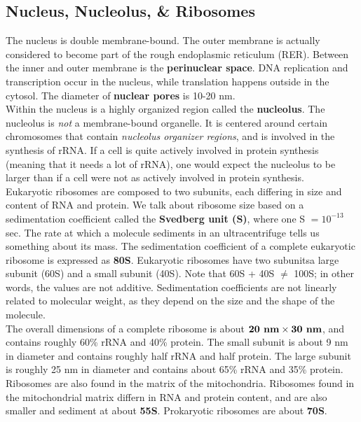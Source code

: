 \documentclass{article}
\theoremstyle{plain}%
\theoremstyle{definition}
\theoremstyle{remark}
\begin{document}
\subsection{Nucleus, Nucleolus, \& Ribosomes}
The nucleus is double membrane-bound. The outer membrane is actually considered to become part of the rough endoplasmic reticulum (RER). Between the inner and outer membrane is the \textbf{perinuclear space}. DNA replication and transcription occur in the nucleus, while translation happens outside in the cytosol. The diameter of \textbf{nuclear pores} is 10-20 nm. \\
\indent Within the nucleus is a highly organized region called the \textbf{nucleolus}. The nucleolus is \textit{not} a membrane-bound organelle. It is centered around certain chromosomes that contain \textit{nucleolus organizer regions}, and is involved in the synthesis of rRNA. If a cell is quite actively involved in protein synthesis (meaning that it needs a lot of rRNA), one would expect the nucleolus to be larger than if a cell were not as actively involved in protein synthesis. \\
\indent Eukaryotic ribosomes are composed to two subunits, each differing in size and content of RNA and protein. We talk about ribosome size based on a sedimentation coefficient called the \textbf{Svedberg unit (S)}, where one S $=10^{-13}$ sec. The rate at which a molecule sediments in an ultracentrifuge tells us something about its mass. The sedimentation coefficient of a complete eukaryotic ribosome is expressed as \textbf{80S}. Eukaryotic ribosomes have two subunits\textemdash a large subunit (60S) and a small subunit (40S). Note that 60S + 40S $\neq$ 100S; in other words, the values are not additive. Sedimentation coefficients are not linearly related to molecular weight, as they depend on the size and the shape of the molecule. \\
\indent The overall dimensions of a complete ribosome is about $\text{\textbf{20 nm}}\times\text{\textbf{30 nm}}$, and contains roughly 60\% rRNA and 40\% protein. The small subunit is about 9 nm in diameter and contains roughly half rRNA and half protein. The large subunit is roughly 25 nm in diameter and contains about 65\% rRNA and 35\% protein. \\
\indent Ribosomes are also found in the matrix of the mitochondria. Ribosomes found in the mitochondrial matrix differn in RNA and protein content, and are also smaller and sediment at about \textbf{55S}. Prokaryotic ribosomes are about \textbf{70S}. 
\end{document}
